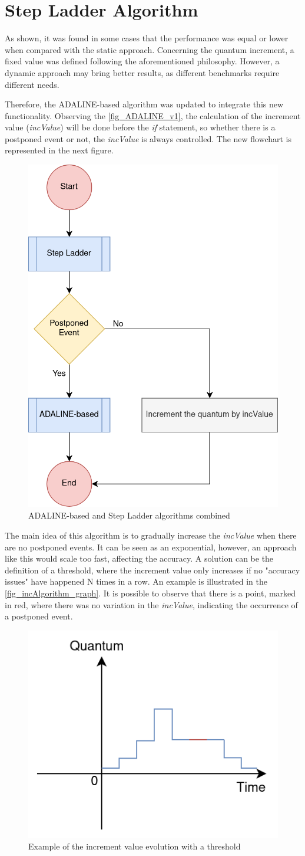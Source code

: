 \section{Step Ladder Algorithm}

As shown, it was found in some cases that the performance was equal or lower when compared with the static approach. Concerning the quantum 
increment, a fixed value was defined following the aforementioned philosophy. However, a dynamic approach may bring better results, as different 
benchmarks require different needs. 

Therefore, the ADALINE-based algorithm was updated to integrate this new functionality. Observing the \autoref{fig_ADALINE_v1}, the calculation of the 
increment value (\textit{incValue}) will be done before the \textit{if} statement, so whether there is a postponed event or not, the \textit{incValue} is always controlled. 
The new flowchart is represented in the next figure.

\begin{figure}[H]
	\centering
 	\includegraphics[width=0.32\linewidth]{Images/ADALINE_v2.png}
 	\caption{ADALINE-based and Step Ladder algorithms combined}
	 \label{fig_ADALINE_v2}
\end{figure}

The main idea of this algorithm is to gradually increase the \textit{incValue} when there are no postponed events. 
It can be seen as an exponential, however, an approach like this would scale too fast, affecting the accuracy. A solution can be 
the definition of a threshold, where the increment value only increases if no "accuracy issues" have happened N times in a row. An example is 
illustrated in the \autoref{fig_incAlgorithm_graph}. It is possible to observe that there is a point, marked in red, 
where there was no variation in the \textit{incValue}, indicating the occurrence of a postponed event.

\begin{figure}[h!]
	\centering
 	\includegraphics[width=0.4\linewidth]{Images/incAlgorithm_graph.png}
 	\caption{Example of the increment value evolution with a threshold}
	 \label{fig_incAlgorithm_graph}
\end{figure}

